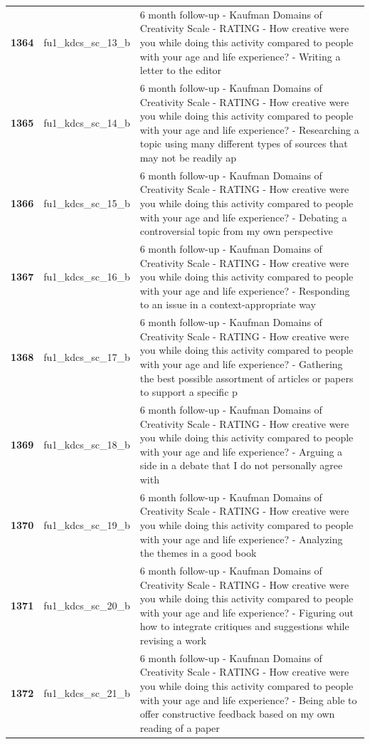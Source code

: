 \documentclass[
  letterpaper,
  DIV=11,
  numbers=noendperiod]{scrartcl}
\begin{document}
\begin{longtable}[t]{>{}cll}
\textbf{1364} & fu1\_kdcs\_sc\_13\_b & 6 month follow-up - Kaufman Domains of Creativity Scale - RATING - How creative were you while doing this activity compared to people with your age and life experience? - Writing a letter to the editor\\
\textbf{1365} & fu1\_kdcs\_sc\_14\_b & 6 month follow-up - Kaufman Domains of Creativity Scale - RATING - How creative were you while doing this activity compared to people with your age and life experience? - Researching a topic using many different types of sources that may not be readily ap\\
\addlinespace
\textbf{1366} & fu1\_kdcs\_sc\_15\_b & 6 month follow-up - Kaufman Domains of Creativity Scale - RATING - How creative were you while doing this activity compared to people with your age and life experience? - Debating a controversial topic from my own perspective\\
\textbf{1367} & fu1\_kdcs\_sc\_16\_b & 6 month follow-up - Kaufman Domains of Creativity Scale - RATING - How creative were you while doing this activity compared to people with your age and life experience? - Responding to an issue in a context-appropriate way\\
\textbf{1368} & fu1\_kdcs\_sc\_17\_b & 6 month follow-up - Kaufman Domains of Creativity Scale - RATING - How creative were you while doing this activity compared to people with your age and life experience? - Gathering the best possible assortment of articles or papers to support a specific p\\
\textbf{1369} & fu1\_kdcs\_sc\_18\_b & 6 month follow-up - Kaufman Domains of Creativity Scale - RATING - How creative were you while doing this activity compared to people with your age and life experience? - Arguing a side in a debate that I do not personally agree with\\
\textbf{1370} & fu1\_kdcs\_sc\_19\_b & 6 month follow-up - Kaufman Domains of Creativity Scale - RATING - How creative were you while doing this activity compared to people with your age and life experience? - Analyzing the themes in a good book\\
\addlinespace
\textbf{1371} & fu1\_kdcs\_sc\_20\_b & 6 month follow-up - Kaufman Domains of Creativity Scale - RATING - How creative were you while doing this activity compared to people with your age and life experience? - Figuring out how to integrate critiques and suggestions while revising a work\\
\textbf{1372} & fu1\_kdcs\_sc\_21\_b & 6 month follow-up - Kaufman Domains of Creativity Scale - RATING - How creative were you while doing this activity compared to people with your age and life experience? - Being able to offer constructive feedback based on my own reading of a paper\\

\end{longtable}
\end{document}
